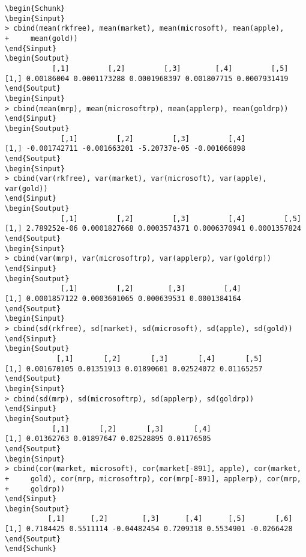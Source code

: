 \documentclass[12pt, a14paper, lithuanian]{article}
\begin{document}
\begin{verbatim}
\begin{Schunk}
\begin{Sinput}
> cbind(mean(rkfree), mean(market), mean(microsoft), mean(apple), 
+     mean(gold))
\end{Sinput}
\begin{Soutput}
           [,1]         [,2]         [,3]        [,4]         [,5]
[1,] 0.00186004 0.0001173288 0.0001968397 0.001807715 0.0007931419
\end{Soutput}
\begin{Sinput}
> cbind(mean(mrp), mean(microsoftrp), mean(applerp), mean(goldrp))
\end{Sinput}
\begin{Soutput}
             [,1]         [,2]         [,3]         [,4]
[1,] -0.001742711 -0.001663201 -5.20737e-05 -0.001066898
\end{Soutput}
\begin{Sinput}
> cbind(var(rkfree), var(market), var(microsoft), var(apple), var(gold))
\end{Sinput}
\begin{Soutput}
             [,1]         [,2]         [,3]         [,4]         [,5]
[1,] 2.789252e-06 0.0001827668 0.0003574371 0.0006370941 0.0001357824
\end{Soutput}
\begin{Sinput}
> cbind(var(mrp), var(microsoftrp), var(applerp), var(goldrp))
\end{Sinput}
\begin{Soutput}
             [,1]         [,2]        [,3]         [,4]
[1,] 0.0001857122 0.0003601065 0.000639531 0.0001384164
\end{Soutput}
\begin{Sinput}
> cbind(sd(rkfree), sd(market), sd(microsoft), sd(apple), sd(gold))
\end{Sinput}
\begin{Soutput}
            [,1]       [,2]       [,3]       [,4]       [,5]
[1,] 0.001670105 0.01351913 0.01890601 0.02524072 0.01165257
\end{Soutput}
\begin{Sinput}
> cbind(sd(mrp), sd(microsoftrp), sd(applerp), sd(goldrp))
\end{Sinput}
\begin{Soutput}
           [,1]       [,2]       [,3]       [,4]
[1,] 0.01362763 0.01897647 0.02528895 0.01176505
\end{Soutput}
\begin{Sinput}
> cbind(cor(market, microsoft), cor(market[-891], apple), cor(market, 
+     gold), cor(mrp, microsoftrp), cor(mrp[-891], applerp), cor(mrp, 
+     goldrp))
\end{Sinput}
\begin{Soutput}
          [,1]      [,2]        [,3]      [,4]      [,5]       [,6]
[1,] 0.7184425 0.5511114 -0.04482454 0.7209318 0.5534901 -0.0266428
\end{Soutput}
\end{Schunk}

\end{verbatim}
\end{document}
